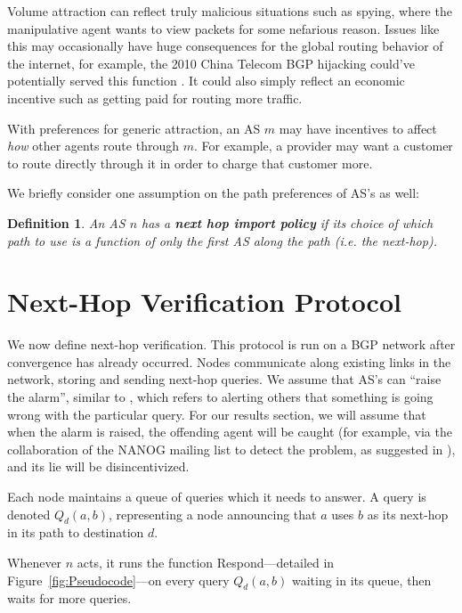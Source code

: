 \documentclass[pdftex,twoside,twocolumn,10pt,letterpaper]{article}
\newtheorem{definition}{Definition}
\begin{document}
    Volume attraction can reflect truly malicious situations such as spying,
    where the manipulative agent wants to view packets for some nefarious
    reason. Issues like this may occasionally have huge consequences for the
    global routing behavior of the internet, for example, the 2010
    China Telecom BGP hijacking could've potentially served this function
    \cite{ChinaHijack}. It could also simply reflect an economic incentive such as
    getting paid for routing more traffic.

    With preferences for generic attraction, an AS $m$ may have incentives to affect
    \emph{how} other agents route through $m$.
    For example, a provider may want a customer to route directly through it
    in order to charge that customer more.

    We briefly consider one assumption on the path preferences of AS's as well:
    \begin{definition}
      An AS $n$ has a \textbf{next hop import policy} if its choice of which path to use
      is a function of only the first AS along the path (i.e. the next-hop).
    \end{definition}

\section{Next-Hop Verification Protocol}
  We now define next-hop verification.
  This protocol is run on a BGP network after convergence has already occurred.
  Nodes communicate along existing links in the network, storing and sending
  next-hop queries. We assume that AS's can ``raise the alarm'', similar to
  \cite{Attraction}, which refers to alerting others that something
  is going wrong with the particular query. For our results section,
  we will assume that when the alarm is raised, the offending agent will be
  caught (for example, via the collaboration of the NANOG mailing list to detect
  the problem, as suggested in \cite{Attraction}), and its lie will be
  disincentivized.

  Each node maintains a queue of queries which it needs to answer.
  A query is denoted $Q_d(a,b)$, representing a node announcing that
  $a$ uses $b$ as its next-hop in its path to destination $d$.
  
  Whenever $n$ acts, it runs the function {\sc Respond}---detailed in Figure~\ref{fig:Pseudocode}---on every query
  $Q_d(a,b)$ waiting in its queue, then waits for more queries.
  
\end{document}
